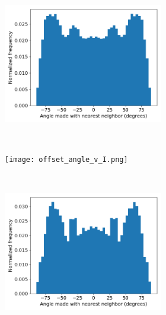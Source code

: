 \documentclass{article}
\begin{document}
\begin{figure}[ht]
\centering
\begin{subfigure}{\linewidth}
\centering
\begin{subfigure}{0.45\textwidth}
	\centering
	\includegraphics[width=\linewidth]{offset_tail_packing.png}
	\caption{}~\label{fig:offset_tails}	
\end{subfigure}
\begin{subfigure}{0.45\textwidth}
	\centering
	\texttt{[image: offset\_angle\_v\_I.png]}
	\caption{}~\label{fig:layered_tails}
\end{subfigure}
\end{subfigure}
\begin{subfigure}{\linewidth}
\centering
\begin{subfigure}{0.45\textwidth}
	\centering
	\includegraphics[width=\linewidth]{angles_traj_layered.png}

\end{subfigure}
\end{subfigure}
\end{figure}
\end{document}
